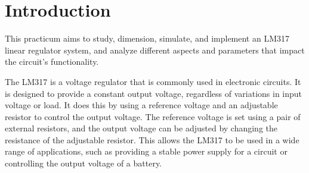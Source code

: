\documentclass[12pt]{article}
\begin{document}
\pagestyle{fancy}
\chead {\today}
\fontsize{16}{16}\selectfont


\clearpage


\tableofcontents
\clearpage

\section{Introduction}
This practicum aims to study, dimension, simulate, and implement an LM317 linear regulator system, and analyze different aspects and parameters that impact the circuit's functionality. \vspace{+12pt}

The LM317 is a voltage regulator that is commonly used in electronic circuits. It is designed to provide a constant output voltage, regardless of variations in input voltage or load. It does this by using a reference voltage and an adjustable resistor to control the output voltage. The reference voltage is set using a pair of external resistors, and the output voltage can be adjusted by changing the resistance of the adjustable resistor. This allows the LM317 to be used in a wide range of applications, such as providing a stable power supply for a circuit or controlling the output voltage of a battery.
\clearpage





\end{document}
